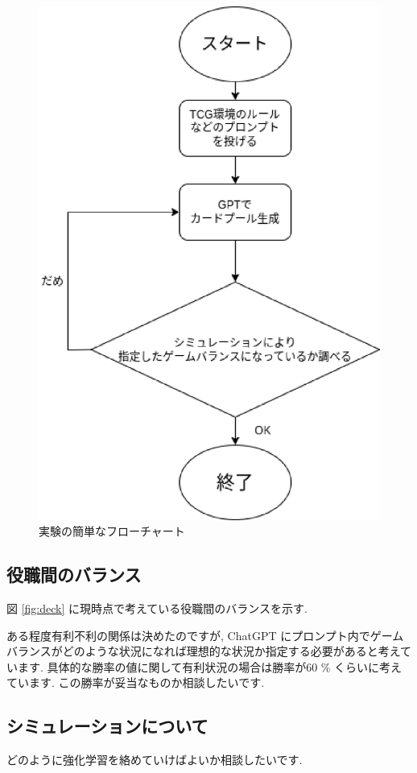 \documentclass{jarticle}     %
\begin{document}
\begin{figure}[ht]
  \centering
  \includegraphics[width=120mm]{assets/flow.eps}
  \vspace{-0.3cm}
  \caption{実験の簡単なフローチャート}
  \label{fig:flow}
\end{figure}

\subsection{役職間のバランス}
図 \ref{fig:deck} に現時点で考えている役職間のバランスを示す. \par
ある程度有利不利の関係は決めたのですが, ChatGPT にプロンプト内でゲームバランスがどのような状況になれば理想的な状況か指定する必要があると考えています. 具体的な勝率の値に関して有利状況の場合は勝率が60 \% くらいに考えています. この勝率が妥当なものか相談したいです.

\subsection{シミュレーションについて}
どのように強化学習を絡めていけばよいか相談したいです.
\end{document}

